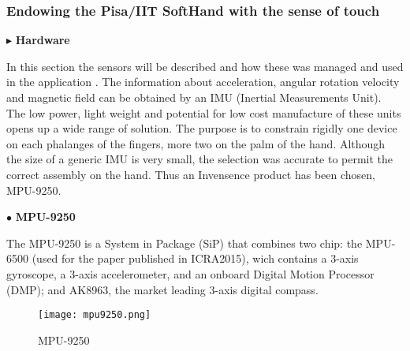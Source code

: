 
\subsubsection{Endowing the Pisa/IIT SoftHand with the sense of touch}
\label{sec:SenseOfTouch}


\noindent $\blacktriangleright$  \textbf{Hardware} \\ 
\newline

In this section the sensors will be described and how these was managed and used in the application . The information about acceleration, angular rotation velocity and  magnetic field can be obtained by an IMU (Inertial Measurements Unit).  The low power, light weight and potential for low cost manufacture of these units opens up a wide range of solution. The  purpose is to constrain rigidly one device on each phalanges of the fingers, more two  on the palm of the hand.  Although the size of a generic IMU is very small, the selection  was accurate to permit the correct assembly on the hand. Thus an Invensence product has been chosen, MPU-9250.  \\
\newline

\noindent $\bullet$ \textbf{MPU-9250}

\noindent The MPU-9250 is a System in Package (SiP) that combines two chip: the MPU-6500 (used for the paper published in ICRA2015), wich contains a 3-axis gyroscope, a 3-axis accelerometer, and an onboard Digital Motion Processor (DMP); and AK8963, the market leading 3-axis digital compass.  
\begin{figure}[h]
\centering
\texttt{[image: mpu9250.png]}
\caption{MPU-9250}
\label{fig:mpu9250}
\end{figure}

